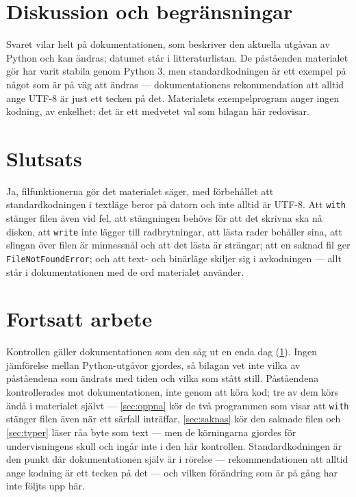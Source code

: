 \section{Diskussion och begränsningar}
\label{sec:dok-diskussion}

Svaret vilar helt på dokumentationen, som beskriver den aktuella
utgåvan av Python och kan ändras; datumet står i litteraturlistan.  De
påståenden materialet gör har varit stabila genom Python 3, men
standardkodningen är ett exempel på något som är på väg att ändras ---
dokumentationens rekommendation att alltid ange UTF-8 är just ett tecken
på det.  Materialets exempelprogram anger ingen kodning, av enkelhet;
det är ett medvetet val som bilagan här redovisar.

\section{Slutsats}
\label{sec:dok-slutsats}

Ja, filfunktionerna gör det materialet säger, med förbehållet att
standardkodningen i textläge beror på datorn och inte alltid är UTF-8.
Att \texttt{with} stänger filen även vid fel, att stängningen
behövs för att det skrivna ska nå disken, att \texttt{write}
inte lägger till radbrytningar, att lästa rader behåller sina, att slingan
över filen är minnessnål och att det lästa är
strängar\autocite{PythonTutorialFiles}; att en saknad fil ger
\texttt{FileNotFoundError}\autocite{PythonExceptions}; och att
text- och binärläge skiljer sig i avkodningen\autocite{PythonOpen} ---
allt står i dokumentationen med de ord materialet använder.


\section{Fortsatt arbete}
\label{sec:dok-fortsatt}

Kontrollen gäller dokumentationen som den såg ut en enda dag
(\cref{sec:dok-diskussion}).  Ingen jämförelse mellan Python-utgåvor
gjordes, så bilagan vet inte vilka av påståendena som ändrats med
tiden och vilka som stått still.  Påståendena kontrollerades mot
dokumentationen, inte genom att köra kod; tre av dem körs ändå i
materialet självt --- \cref{sec:oppna} kör de två programmen som visar
att \texttt{with} stänger filen även när ett särfall
inträffar, \cref{sec:saknas} kör den saknade filen och \cref{sec:typer}
läser råa byte som text --- men de körningarna gjordes för
undervisningens skull och ingår inte i den här kontrollen.
Standardkodningen är den punkt där dokumentationen själv är i rörelse
--- rekommendationen att alltid ange kodning är ett tecken på det ---
och vilken förändring som är på gång har inte följts upp här.

